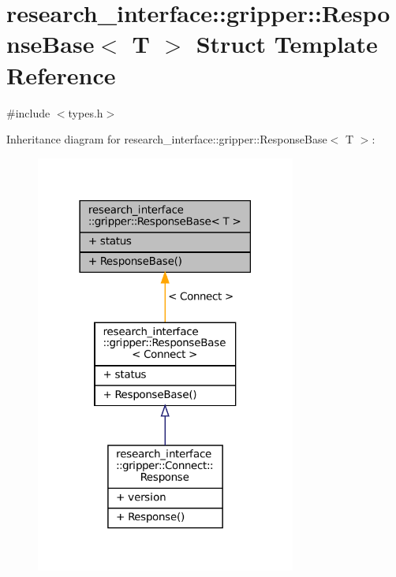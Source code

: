 \hypertarget{structresearch__interface_1_1gripper_1_1ResponseBase}{}\section{research\+\_\+interface\+:\+:gripper\+:\+:Response\+Base$<$ T $>$ Struct Template Reference}
\label{structresearch__interface_1_1gripper_1_1ResponseBase}


{\ttfamily \#include $<$types.\+h$>$}



Inheritance diagram for research\+\_\+interface\+:\+:gripper\+:\+:Response\+Base$<$ T $>$\+:
\nopagebreak
\begin{figure}[H]
\begin{center}
\leavevmode
\includegraphics[width=242pt]{structresearch__interface_1_1gripper_1_1ResponseBase__inherit__graph}
\end{center}
\end{figure}


